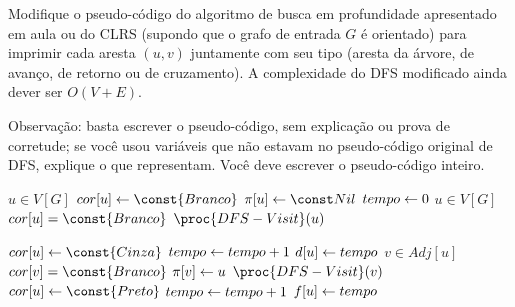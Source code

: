 Modifique o pseudo-código do algoritmo de busca em profundidade apresentado em aula ou do CLRS (supondo que o grafo de entrada $G$ é orientado) para imprimir cada aresta $(u, v)$ juntamente com seu tipo (aresta da árvore, de avanço, de retorno ou de cruzamento). A complexidade do DFS modificado ainda dever ser $O(V + E)$.

Observação: basta escrever o pseudo-código, sem explicação ou prova de corretude; se você usou variáveis que não estavam no pseudo-código original de DFS, explique o que representam. Você deve escrever o pseudo-código inteiro.

\itemdsep

\newcommand{\Branco}{\const{Branco}\xspace}
\newcommand{\Cinza}{\const{Cinza}\xspace}
\newcommand{\Preto}{\const{Preto}\xspace}

\begin{codebox}
\li \Para \Cada $u \in V[G]$ \Faca
    \Do
\li     $cor[u] \Recebe \Branco$
\li     $\pi[u] \Recebe \Nulo$
    \End
\li $tempo \leftarrow 0$
\li \Para \Cada $u \in V[G]$ \Faca
    \Do
\li     \Se $cor[u] = \Branco$
        \Do
\li         \Entao $\proc{DFS-Visit}(u)$
        \End
    \End
\end{codebox}

\begin{codebox}
\li $cor[u] \Recebe \Cinza$
\li $tempo \leftarrow tempo + 1$
\li $d[u] \leftarrow tempo$
\li \Para \Cada $v \in Adj[u]$
    \Do
\li     \Se $cor[v] = \Branco$ \Entao
        \Do
\li         \Entao
            \Do
\li             $\pi[v] \leftarrow u$
\li             $\proc{DFS-Visit}(v)$
            \End
        \End
    \End
\li $cor[u] \Recebe \Preto$
\li $tempo \leftarrow tempo + 1$
\li $f[u] \leftarrow tempo$
\end{codebox}
